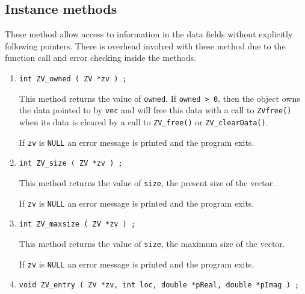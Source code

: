 \subsection{Instance methods}
\label{subsection:ZV:proto:Instance}
\par
These method allow access to information in the data fields without
explicitly following pointers.
There is overhead involved with these method due to the function
call and error checking inside the methods.
\par
\begin{enumerate}
\item
\begin{verbatim}
int ZV_owned ( ZV *zv ) ;
\end{verbatim}
This method returns the value of {\tt owned}.
If {\tt owned > 0}, 
then the object owns the data pointed to by {\tt vec}
and will free this data with a call to {\tt ZVfree()} when its data
is cleared by a call to {\tt ZV\_free()} or {\tt ZV\_clearData()}.
\par {}
If {\tt zv} is {\tt NULL}
an error message is printed and the program exits.
\item
\begin{verbatim}
int ZV_size ( ZV *zv ) ;
\end{verbatim}
This method returns the value of {\tt size},
the present size of the vector.
\par {}
If {\tt zv} is {\tt NULL}
an error message is printed and the program exits.
\item
\begin{verbatim}
int ZV_maxsize ( ZV *zv ) ;
\end{verbatim}
This method returns the value of {\tt size},
the maximum size of the vector.
\par {}
If {\tt zv} is {\tt NULL}
an error message is printed and the program exits.
\item
\begin{verbatim}
void ZV_entry ( ZV *zv, int loc, double *pReal, double *pImag ) ;

\end{verbatim}
\end{enumerate}
